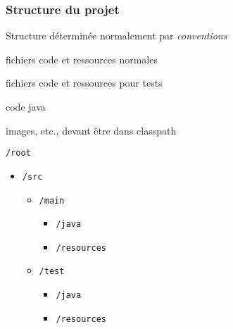 \documentclass[english, french]{beamer}
\begin{document}
\begin{frame}
	\frametitle{Structure du projet}
	\begin{minipage}{5.5cm}
		Structure déterminée {\tiny normalement} par \emph{conventions}
		\begin{description}
			\item[\texttt{/src/main/…}] fichiers code et ressources \og{}normales\fg{}
			\item[\texttt{/src/test/…}] fichiers code et ressources pour tests
			\item[\texttt{…/java}] code java
			\item[\texttt{…/resources}] images, etc., devant être dans classpath
		\end{description}
	\end{minipage}\hfill%
	\begin{minipage}{4cm}
		\texttt{/root}
		\begin{itemize}
			\item[] \texttt{/src}
			\begin{itemize}
				\item[] \texttt{/main}
				\begin{itemize}
					\item[] \texttt{/java}
				\end{itemize}\vspace{-0.8ex}
				\begin{itemize}
					\item[] \texttt{/resources}
				\end{itemize}\vspace{-0.8ex}
				\item[] \texttt{/test}
				\begin{itemize}
					\item[] \texttt{/java}
				\end{itemize}\vspace{-0.8ex}
				\begin{itemize}
					\item[] \texttt{/resources}
				\end{itemize}\vspace{-0.8ex}
			\end{itemize}
		\end{itemize}
	\end{minipage}
\end{frame}
\end{document}
